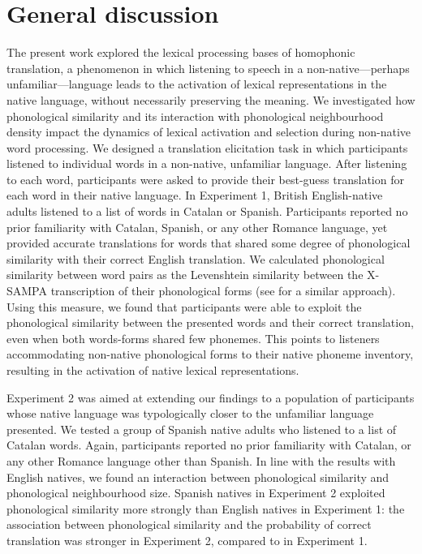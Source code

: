\documentclass[
]{article}
\begin{document}
\section{General discussion}\label{general-discussion}

The present work explored the lexical processing bases of homophonic
translation, a phenomenon in which listening to speech in a
non-native---perhaps unfamiliar---language leads to the activation of
lexical representations in the native language, without necessarily
preserving the meaning. We investigated how phonological similarity and
its interaction with phonological neighbourhood density impact the
dynamics of lexical activation and selection during non-native word
processing. We designed a translation elicitation task in which
participants listened to individual words in a non-native, unfamiliar
language. After listening to each word, participants were asked to
provide their best-guess translation for each word in their native
language. In Experiment 1, British English-native adults listened to a
list of words in Catalan or Spanish. Participants reported no prior
familiarity with Catalan, Spanish, or any other Romance language, yet
provided accurate translations for words that shared some degree of
phonological similarity with their correct English translation. We
calculated phonological similarity between word pairs as the Levenshtein
similarity between the X-SAMPA transcription of their phonological forms
(see  for a
similar approach). Using this measure, we found that participants were
able to exploit the phonological similarity between the presented words
and their correct translation, even when both words-forms shared few
phonemes. This points to listeners accommodating non-native phonological
forms to their native phoneme inventory, resulting in the activation of
native lexical representations.

Experiment 2 was aimed at extending our findings to a population of
participants whose native language was typologically closer to the
unfamiliar language presented. We tested a group of Spanish native
adults who listened to a list of Catalan words. Again, participants
reported no prior familiarity with Catalan, or any other Romance
language other than Spanish. In line with the results with English
natives, we found an interaction between phonological similarity and
phonological neighbourhood size. Spanish natives in Experiment 2
exploited phonological similarity more strongly than English natives in
Experiment 1: the association between phonological similarity and the
probability of correct translation was stronger in Experiment 2,
compared to in Experiment 1.
\end{document}
